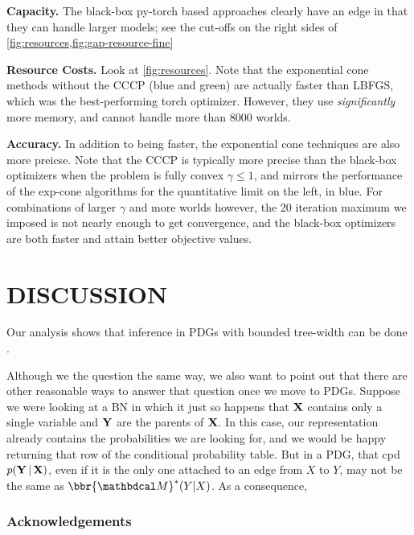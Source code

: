 \documentclass[twoside]{article}
\begin{document}
\textbf{Capacity.} 
The black-box py-torch based approaches clearly have an edge in that they can handle larger models; see the cut-offs on the right sides of \cref{fig:resources,fig:gap-resource-fine}

\textbf{Resource Costs.} 
Look at \cref{fig:resources}. 
Note that the exponential cone methods without the CCCP (blue and green) are actually faster than LBFGS, which was the best-performing torch optimizer. 
However, they use \emph{significantly} more memory, and cannot handle more than 8000 worlds. 


\textbf{Accuracy.}
In addition to being faster, the exponential cone techniques are also more preicse.
Note that the CCCP is typically more precise than the black-box optimizers when the problem is fully convex $\gamma \le 1$, and mirrors the performance of the exp-cone algorithms for the quantitative limit on the left, in blue.  For combinations of larger $\gamma$ and more worlds however, the 20 iteration maximum we imposed is not nearly enough to get convergence, and the black-box optimizers are both faster and attain better objective values.

\section{DISCUSSION}

Our analysis shows that inference in PDGs with bounded tree-width can be done .


Although we the question the same way, we also want to point out that there are other reasonable ways to answer that question once we move to PDGs.
Suppose we were looking at a BN in which it just so happens that $\mathbf{X}$ contains only a single variable and $\mathbf{Y}$ are the parents of $\mathbf{X}$.
In this case, our representation already contains the probabilities we are looking for, and we would be happy returning that row of the conditional probability table. 
But in a PDG, that cpd $p(\mathbf{Y} \,|\,\mathbf{X})$, even if it is the only one
attached to an edge from $X$ to $Y$, may not be the same as $\bbr{\dg M}^*(Y|X)$.
As a consequence, 




\subsubsection*{Acknowledgements}
\end{document}
